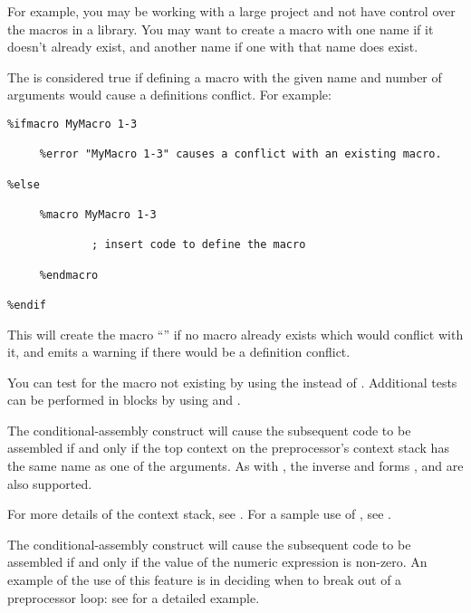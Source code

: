 For example, you may be working with a large project and not have control
over the macros in a library. You may want to create a macro with one
name if it doesn't already exist, and another name if one with that name
does exist.

The  is considered true if defining a macro with the given name
and number of arguments would cause a definitions conflict. For example:

\begin{lstlisting}
%ifmacro MyMacro 1-3

     %error "MyMacro 1-3" causes a conflict with an existing macro.

%else

     %macro MyMacro 1-3

             ; insert code to define the macro

     %endmacro

%endif
\end{lstlisting}

This will create the macro ``'' if no macro already exists which
would conflict with it, and emits a warning if there would be a definition
conflict.

You can test for the macro not existing by using the 
instead of . Additional tests can be performed in
 blocks by using  and
.


The conditional-assembly construct  will cause the
subsequent code to be assembled if and only if the top context on
the preprocessor's context stack has the same name as one of the arguments.
As with , the inverse and  forms ,
 and  are also supported.

For more details of the context stack, see .
For a sample use of , see .


The conditional-assembly construct  will cause the
subsequent code to be assembled if and only if the value of the
numeric expression  is non-zero. An example of the use of
this feature is in deciding when to break out of a 
preprocessor loop: see  for a detailed example.

